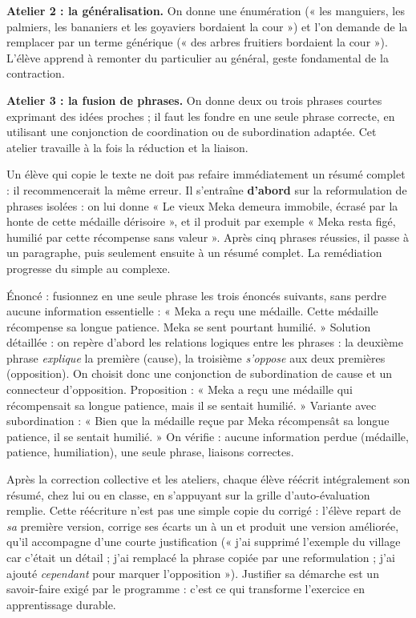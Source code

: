 \documentclass[11pt]{article}
\newcommand{\cle}[1]{{\popxbold\color{popdark}#1}}
\newcounter{popsec}
\newcounter{popsub}
\newcommand{\courssub}[1]{%
  \stepcounter{popsub}%
  \par\vspace{9pt}\noindent{\popxbold\fontsize{11.5}{13}\selectfont\color{popink}{\color{poporange}\thepopsec.\thepopsub}\hspace{6pt}#1}\par\nopagebreak\vspace{4pt}
}
\begin{document}
\textbf{Atelier 2 : la généralisation.} On donne une énumération (« les manguiers, les palmiers, les bananiers et les goyaviers bordaient la cour ») et l'on demande de la remplacer par un terme générique (« des arbres fruitiers bordaient la cour »). L'élève apprend à remonter du particulier au général, geste fondamental de la contraction.

\textbf{Atelier 3 : la fusion de phrases.} On donne deux ou trois phrases courtes exprimant des idées proches ; il faut les fondre en une seule phrase correcte, en utilisant une conjonction de coordination ou de subordination adaptée. Cet atelier travaille à la fois la réduction et la liaison.

\begin{exemplebox}
Un élève qui copie le texte ne doit pas refaire immédiatement un résumé complet : il recommencerait la même erreur. Il s'entraîne \textbf{d'abord} sur la reformulation de phrases isolées : on lui donne « Le vieux Meka demeura immobile, écrasé par la honte de cette médaille dérisoire », et il produit par exemple « Meka resta figé, humilié par cette récompense sans valeur ». Après cinq phrases réussies, il passe à un paragraphe, puis seulement ensuite à un résumé complet. La remédiation progresse du simple au complexe.
\end{exemplebox}

\begin{exoresolu}
Énoncé : fusionnez en une seule phrase les trois énoncés suivants, sans perdre aucune information essentielle : « Meka a reçu une médaille. Cette médaille récompense sa longue patience. Meka se sent pourtant humilié. »
\tcblower
Solution détaillée : on repère d'abord les relations logiques entre les phrases : la deuxième phrase \emph{explique} la première (cause), la troisième \emph{s'oppose} aux deux premières (opposition). On choisit donc une conjonction de subordination de cause et un connecteur d'opposition. Proposition : « Meka a reçu une médaille qui récompensait sa longue patience, mais il se sentait humilié. » Variante avec subordination : « Bien que la médaille reçue par Meka récompensât sa longue patience, il se sentait humilié. » On vérifie : aucune information perdue (médaille, patience, humiliation), une seule phrase, liaisons correctes.
\end{exoresolu}

\courssub{Réécriture individuelle du résumé}

Après la correction collective et les ateliers, chaque élève \cle{réécrit} intégralement son résumé, chez lui ou en classe, en s'appuyant sur la grille d'auto-évaluation remplie. Cette réécriture n'est pas une simple copie du corrigé : l'élève repart de \emph{sa} première version, corrige ses écarts un à un et produit une version améliorée, qu'il accompagne d'une courte justification (« j'ai supprimé l'exemple du village car c'était un détail ; j'ai remplacé la phrase copiée par une reformulation ; j'ai ajouté \emph{cependant} pour marquer l'opposition »). Justifier sa démarche est un savoir-faire exigé par le programme : c'est ce qui transforme l'exercice en apprentissage durable.
\end{document}
